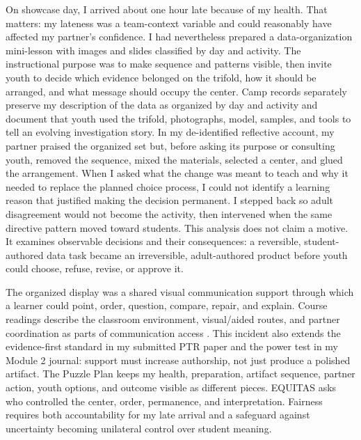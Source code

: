 \documentclass[11pt]{article}
\newcommand{\reviewsection}[1]{%
  \Needspace{4\baselineskip}
  \vspace{0.08in}\noindent{\normalsize\bfseries\color{PrimaryRed}#1}
  \par\vspace{0.025in}
}
\begin{document}
\reviewsection{Adult Partner Practice as Communication Access}
On showcase day, I arrived about one hour late because of my health. That matters: my lateness was a team-context variable and could reasonably have affected my partner's confidence. I had nevertheless prepared a data-organization mini-lesson with images and slides classified by day and activity. The instructional purpose was to make sequence and patterns visible, then invite youth to decide which evidence belonged on the trifold, how it should be arranged, and what message should occupy the center. Camp records separately preserve my description of the data as organized by day and activity and document that youth used the trifold, photographs, model, samples, and tools to tell an evolving investigation story. In my de-identified reflective account, my partner praised the organized set but, before asking its purpose or consulting youth, removed the sequence, mixed the materials, selected a center, and glued the arrangement. When I asked what the change was meant to teach and why it needed to replace the planned choice process, I could not identify a learning reason that justified making the decision permanent. I stepped back so adult disagreement would not become the activity, then intervened when the same directive pattern moved toward students. This analysis does not claim a motive. It examines observable decisions and their consequences: a reversible, student-authored data task became an irreversible, adult-authored product before youth could choose, refuse, revise, or approve it.

The organized display was a shared visual communication support through which a learner could point, order, question, compare, repair, and explain. Course readings describe the classroom environment, visual/aided routes, and partner coordination as parts of communication access \citep{downing2015classroom,mirenda2015aids,norrie2021context}. This incident also extends the evidence-first standard in my submitted PTR paper and the power test in my Module 2 journal: support must increase authorship, not just produce a polished artifact. The Puzzle Plan keeps my health, preparation, artifact sequence, partner action, youth options, and outcome visible as different pieces. EQUITAS asks who controlled the center, order, permanence, and interpretation. Fairness requires both accountability for my late arrival and a safeguard against uncertainty becoming unilateral control over student meaning.
\end{document}
